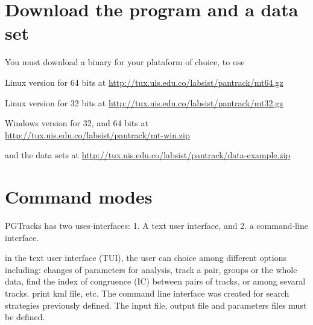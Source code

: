 

% 
% 
% 


% 
% 
% 
% 



\section{Download the program and a data set}

You must  download a binary for your plataform  of choice, to use \mt 


Linux version for 64 bits at \url{http://tux.uis.edu.co/labsist/pantrack/mt64.gz}

Linux version for 32 bits at \url{http://tux.uis.edu.co/labsist/pantrack/mt32.gz}
 

Windows version for 32, and 64 bits at \url{http://tux.uis.edu.co/labsist/pantrack/mt-win.zip}

and the data sets at \url{http://tux.uis.edu.co/labsist/pantrack/data-example.zip}


\vspace{-7\baselineskip}
\vspace{7\baselineskip}


\section{Command modes}

PGTracks has two uses-interfaces: 1. A text user interface, and 2. a command-line interface. 


in the text user interface (TUI), the user can choice among different options including: changes of parameters for analysis, track a pair, groups or the whole data, find the index of congruence (IC) between pairs of tracks, or among sevaral tracks. print kml file, etc.
The command line interface was created for search strategies previously defined. The input file, output file and parameters files must be defined.

